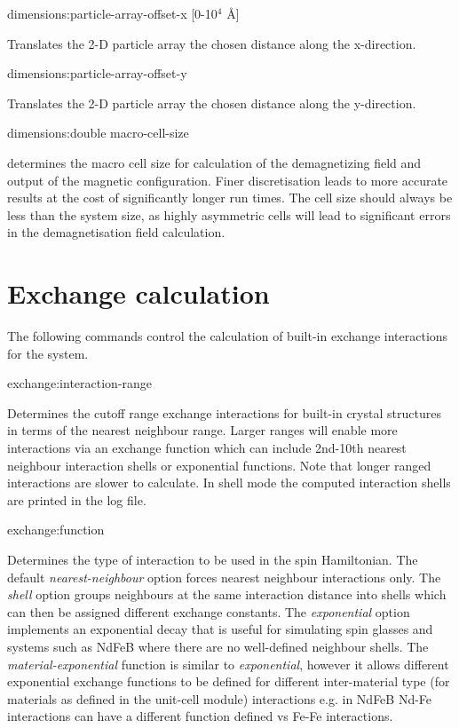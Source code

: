 {\zicf dimensions:particle-array-offset-x [0-10$^4$ \AA]} Translates the 2-D particle array the chosen distance along the x-direction.

{\zicf dimensions:particle-array-offset-y} Translates the 2-D particle array the chosen distance along the y-direction.

{\zicf dimensions:double macro-cell-size} determines the macro cell size for calculation of the demagnetizing field and output of the magnetic configuration. Finer discretisation leads to more accurate results at the cost of significantly longer run times. The cell size should always be less than the system size, as highly asymmetric cells will lead to significant errors in the demagnetisation field calculation.

\section*{Exchange calculation} The following commands control the calculation of built-in exchange interactions for the system.

{\zicf exchange:interaction-range} Determines the cutoff range exchange interactions for built-in crystal structures in terms of the nearest neighbour range. Larger ranges will enable more interactions via an exchange function which can include 2nd-10th nearest neighbour interaction shells or exponential functions. Note that longer ranged interactions are slower to calculate. In shell mode the computed interaction shells are printed in the log file.

{\zicf exchange:function} Determines the type of interaction to be used in the spin Hamiltonian. The default \textit{nearest-neighbour} option forces nearest neighbour interactions only. The \textit{shell} option groups neighbours at the same interaction distance into shells which can then be assigned different exchange constants. The \textit{exponential} option implements an exponential decay that is useful for simulating spin glasses and systems such as NdFeB where there are no well-defined neighbour shells. The \textit{material-exponential} function is similar to \textit{exponential}, however it allows different exponential exchange functions to be defined for different inter-material type (for materials as defined in the unit-cell module) interactions e.g. in NdFeB Nd-Fe interactions can have a different function defined vs Fe-Fe interactions.

